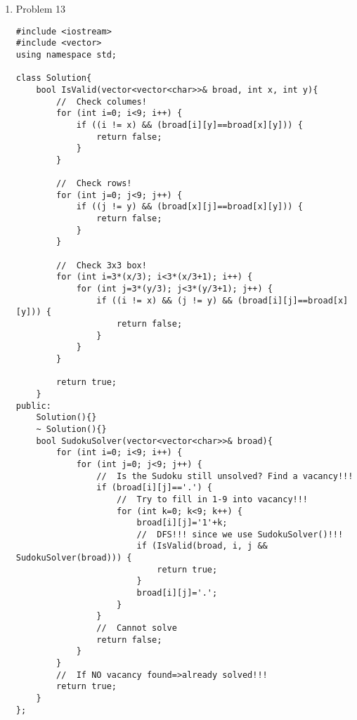 \documentclass[10pt, onecolumn, draftcls]{IEEEtran}
\begin{document}
\begin{enumerate}
\item Problem 13
\begin{lstlisting}
#include <iostream>
#include <vector>
using namespace std;

class Solution{
    bool IsValid(vector<vector<char>>& broad, int x, int y){
        //  Check columes!
        for (int i=0; i<9; i++) {
            if ((i != x) && (broad[i][y]==broad[x][y])) {
                return false;
            }
        }
        
        //  Check rows!
        for (int j=0; j<9; j++) {
            if ((j != y) && (broad[x][j]==broad[x][y])) {
                return false;
            }
        }
        
        //  Check 3x3 box!
        for (int i=3*(x/3); i<3*(x/3+1); i++) {
            for (int j=3*(y/3); j<3*(y/3+1); j++) {
                if ((i != x) && (j != y) && (broad[i][j]==broad[x][y])) {
                    return false;
                }
            }
        }
        
        return true;
    }
public:
    Solution(){}
    ~ Solution(){}
    bool SudokuSolver(vector<vector<char>>& broad){
        for (int i=0; i<9; i++) {
            for (int j=0; j<9; j++) {
                //  Is the Sudoku still unsolved? Find a vacancy!!!
                if (broad[i][j]=='.') {
                    //  Try to fill in 1-9 into vacancy!!!
                    for (int k=0; k<9; k++) {
                        broad[i][j]='1'+k;
                        //  DFS!!! since we use SudokuSolver()!!!
                        if (IsValid(broad, i, j && SudokuSolver(broad))) {
                            return true;
                        }
                        broad[i][j]='.';
                    }
                }
                //  Cannot solve
                return false;
            }
        }
        //  If NO vacancy found=>already solved!!!
        return true;
    }
};


\end{lstlisting}
 
\end{enumerate}
\end{document}
